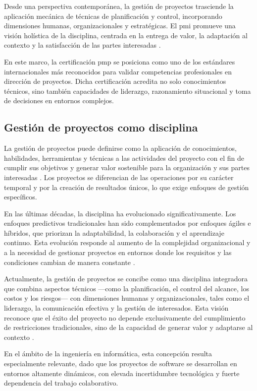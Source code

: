 Desde una perspectiva contemporánea, la gestión de proyectos trasciende la aplicación mecánica de técnicas de planificación y control, incorporando dimensiones humanas, organizacionales y estratégicas. El \gls{pmi} promueve una visión holística de la disciplina, centrada en la entrega de valor, la adaptación al contexto y la satisfacción de las partes interesadas \parencite{pmbok7}.

En este marco, la certificación \gls{pmp} se posiciona como uno de los estándares internacionales más reconocidos para validar competencias profesionales en dirección de proyectos. Dicha certificación acredita no solo conocimientos técnicos, sino también capacidades de liderazgo, razonamiento situacional y toma de decisiones en entornos complejos.

\subsection{Gestión de proyectos como disciplina}

La gestión de proyectos puede definirse como la aplicación de conocimientos, habilidades, herramientas y técnicas a las actividades del proyecto con el fin de cumplir sus objetivos y generar valor sostenible para la organización y sus partes interesadas \parencite{pmbok7}. Los proyectos se diferencian de las operaciones por su carácter temporal y por la creación de resultados únicos, lo que exige enfoques de gestión específicos.

En las últimas décadas, la disciplina ha evolucionado significativamente. Los enfoques predictivos tradicionales han sido complementados por enfoques ágiles e híbridos, que priorizan la adaptabilidad, la colaboración y el aprendizaje continuo. Esta evolución responde al aumento de la complejidad organizacional y a la necesidad de gestionar proyectos en entornos donde los requisitos y las condiciones cambian de manera constante \parencite{pmbok7}.

Actualmente, la gestión de proyectos se concibe como una disciplina integradora que combina aspectos técnicos —como la planificación, el control del alcance, los costos y los riesgos— con dimensiones humanas y organizacionales, tales como el liderazgo, la comunicación efectiva y la gestión de interesados. Esta visión reconoce que el éxito del proyecto no depende exclusivamente del cumplimiento de restricciones tradicionales, sino de la capacidad de generar valor y adaptarse al contexto \parencite{pmbok7}.

En el ámbito de la ingeniería en informática, esta concepción resulta especialmente relevante, dado que los proyectos de software se desarrollan en entornos altamente dinámicos, con elevada incertidumbre tecnológica y fuerte dependencia del trabajo colaborativo.

